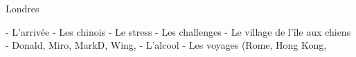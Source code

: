 Londres

- L'arrivée 
- Les chinois
- Le stress
- Les challenges
- Le village de l'île aux chiens 
- Donald, Miro, MarkD, Wing,  
- L'alcool
- Les voyages (Rome, Hong Kong, 
